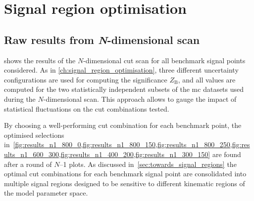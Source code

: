 \section{Signal region optimisation}\label{app:n-1_plots_cut_opt}

\graphicspath{{chapter-optimisation/Figs/Vector/}{chapter-optimisation/Figs/}}

\subsection{Raw results from \textit{N}-dimensional scan}
 shows the results of the $N$-dimensional cut scan for all benchmark signal points considered. As in \cref{ch:signal_region_optimisation}, three different uncertainty configurations are used for computing the significance $Z_\mathrm{B}$, and all values are computed for the two statistically independent subsets of the \gls{mc} datasets used during the $N$-dimensional scan. This approach allows to gauge the impact of statistical fluctuations on the cut combinations tested.

By choosing a well-performing cut combination for each benchmark point, the optimised selections in~\cref{fig:results_n1_800_0,fig:results_n1_800_150,fig:results_n1_800_250,fig:results_n1_600_300,fig:results_n1_400_200,fig:results_n1_300_150} are found after a round of $N$--1 plots. As discussed in~\cref{sec:towards_signal_regions} the optimal cut combinations for each benchmark signal point are consolidated into multiple signal regions designed to be sensitive to different kinematic regions of the model parameter space. 

